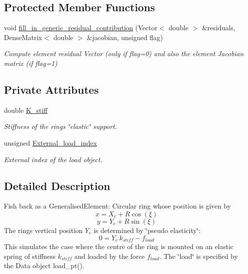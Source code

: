 \subsection*{Protected Member Functions}
\begin{DoxyCompactItemize}
\item 
void \hyperlink{classElasticFishBackElement_a03865180362294a36322523ff2a880ad}{fill\+\_\+in\+\_\+generic\+\_\+residual\+\_\+contribution} (Vector$<$ double $>$ \&residuals, Dense\+Matrix$<$ double $>$ \&jacobian, unsigned flag)
\begin{DoxyCompactList}\small\item\em Compute element residual Vector (only if flag=0) and also the element Jacobian matrix (if flag=1) \end{DoxyCompactList}\end{DoxyCompactItemize}
\subsection*{Private Attributes}
\begin{DoxyCompactItemize}
\item 
double \hyperlink{classElasticFishBackElement_abb0ba4fd55ef0c0b48634eded475e5c7}{K\+\_\+stiff}
\begin{DoxyCompactList}\small\item\em Stiffness of the ring\textquotesingle{}s \char`\"{}elastic\char`\"{} support. \end{DoxyCompactList}\item 
unsigned \hyperlink{classElasticFishBackElement_a721b1c81283045f36467355e77b90fea}{External\+\_\+load\+\_\+index}
\begin{DoxyCompactList}\small\item\em External index of the load object. \end{DoxyCompactList}\end{DoxyCompactItemize}


\subsection{Detailed Description}
Fish back as a Generalised\+Element\+: Circular ring whose position is given by \[ x = X_c + R \cos(\xi) \] \[ y = Y_c + R \sin(\xi) \] The ring\textquotesingle{}s vertical position $ Y_c $ is determined by \char`\"{}pseudo elasticity\char`\"{}\+: \[ 0 = Y_c \ k_{stiff} - f_{load} \] This simulates the case where the centre of the ring is mounted on an elastic spring of stiffness $ k_{stiff} $ and loaded by the force $ f_{load}. $ The \char`\"{}load\char`\"{} is specified by the Data object {\ttfamily load\+\_\+pt()}. 

